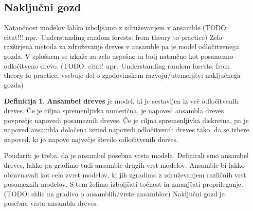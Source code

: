 \documentclass[12pt,a4paper,twoside]{article}
\theoremstyle{definition} %
\newtheorem{definicija}{Definicija}[section]
\theoremstyle{plain} %
\numberwithin{equation}{section}  %
\begin{document}
\subsection{Naključni gozd}

Natančnost modelov lahko izboljšamo z združevanjem v ansamble (TODO: citat!!! npr.\ Understanding random forests: from theory to practice)
Zelo razširjena metoda za združevanje dreves v ansamble pa je model odločitvenega gozda. 
V splošnem se izkaže za zelo uspešno in bolj natančno kot posamezno odločitveno drevo. 
(TODO: citat! npr.\ Understanding random forests: from theory to practice, vsebuje del o zgodovinskem razvoju/utemeljitvi naključnega gozda)

\begin{definicija}
\textbf{Ansambel dreves} je model, ki je sestavljen iz več odločitvenih dreves. 
Če je ciljna spremenljivka numerična, je napoved ansambla dreves povprečje napovedi posameznih dreves. 
Če je ciljna spremenljivka diskretna, pa je napoved ansambla določena izmed napovedi odločitvenih dreves tako, da se izbere napoved, ki jo napove največje število odločitvenih dreves.
\end{definicija}

Poudariti je treba, da je ansambel posebna vrsta modela. 
Definirali smo ansambel dreves, lahko pa gradimo tudi ansamble drugih vrst modelov. 
Ansamble bi lahko obravnavali kot celo zvrst modelov, ki jih zgradimo z združevanjem različnih vrst posameznih modelov. 
S tem želimo izboljšati točnost in zmanjšati preprileganje. (TODO: sklic na gradivo o ansamblih/vrste ansamblov) Naključni gozd je posebna vrsta ansambla dreves.
\end{document}
